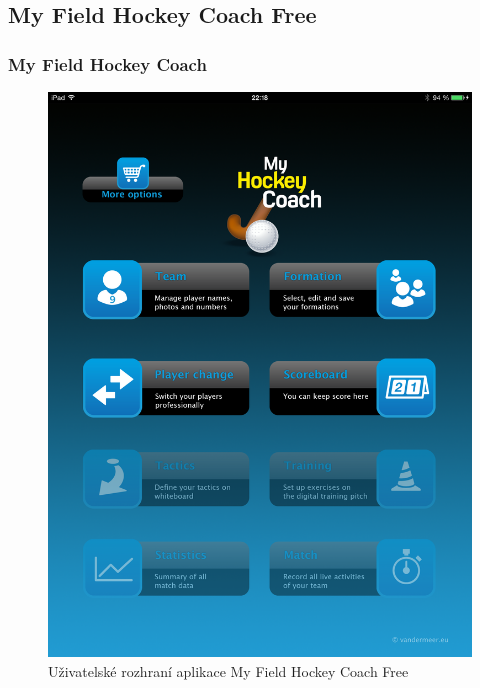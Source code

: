 \documentclass{beamer}
\begin{document}
\subsection{My Field Hockey Coach Free}
\begin{frame}
\frametitle{My Field Hockey Coach}
  \begin{figure}[H]
    \includegraphics[height=.6\textheight]{img/IMG_0019}
    \caption{Uživatelské rozhraní aplikace My Field Hockey Coach Free}
    \label{pic:myfieldhockeycoachfree}
  \end{figure}
\end{frame}
\end{document}
